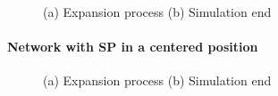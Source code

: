 \begin{figure}[H]
    \centering
    \caption{(a) Expansion process (b) Simulation end}
    \label{fig:foobar}
\end{figure}

\paragraph{Network with SP in a centered position}
\begin{figure}[H]
    \centering
    \caption{(a) Expansion process (b) Simulation end}
    \label{fig:foobar}
\end{figure}

